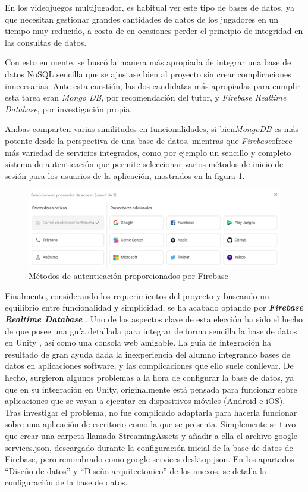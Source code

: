 En los videojuegos multijugador, es habitual ver este tipo de bases de datos, ya que necesitan gestionar grandes cantidades de datos de los jugadores en un tiempo muy reducido, a costa de en ocasiones perder el principio de integridad en las consultas de datos.

Con esto en mente, se buscó la manera más apropiada de integrar una base de datos NoSQL sencilla que se ajustase bien al proyecto sin crear complicaciones innecesarias.
Ante esta cuestión, las dos candidatas más apropiadas para cumplir esta tarea eran \textit{Mongo DB}, por recomendación del tutor, y \textit{Firebase Realtime Database}, por investigación propia.

Ambas comparten varias similitudes en funcionalidades, si bien\textit{MongoDB} es más potente desde la perspectiva de una base de datos, mientras que \textit{Firebase}ofrece más variedad de servicios integrados, como por ejemplo un sencillo y completo sistema de autenticación que permite seleccionar varios métodos de inicio de sesión para los usuarios de la aplicación, mostrados en la figura \ref{fig:Autenticación}.
\begin{figure}[h]
	\centering
	\includegraphics[scale=0.8]{img/DBAuthentication.png}
	\caption{Métodos de autenticación proporcionados por Firebase}
	\label{fig:Autenticación}
\end{figure}
Finalmente, considerando los requerimientos del proyecto y buscando un equilibrio entre funcionalidad y simplicidad, se ha acabado optando por \textbf{\textit{Firebase Realtime Database}} \cite{wiki:Firebase}. 
Uno de los aspectos clave de esta elección ha sido el hecho de que posee una guía detallada para integrar de forma sencilla la base de datos en Unity \cite{wiki:FirebaseWithUnity}, así como una consola web amigable. La guía de integración ha resultado de gran ayuda dada la inexperiencia del alumno integrando bases de datos en aplicaciones software, y las complicaciones que ello suele conllevar. 
De hecho, surgieron algunos problemas a la hora de configurar la base de datos, ya que en su integración en Unity, originalmente está pensada para funcionar sobre aplicaciones que se vayan a ejecutar en dispositivos móviles (Android e iOS). \\
Tras investigar el problema, no fue complicado adaptarla para hacerla funcionar sobre una aplicación de escritorio como la que se presenta. Simplemente se tuvo que crear una carpeta llamada StreamingAssets y añadir a ella el archivo google-services.json, descargado durante la configuración inicial de la base de datos de Firebase, pero renombrado como google-services-desktop.json.
En los apartados “Diseño de datos” y “Diseño arquitectonico” de los anexos, se detalla la configuración de la base de datos.


